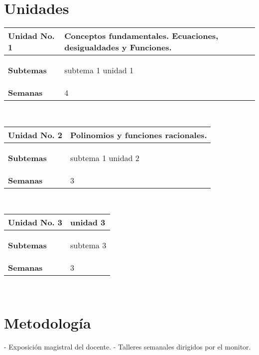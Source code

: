 \documentclass[11pt]{article}
\begin{document}
\section*{Unidades}
\noindent 
\begin{tabular}{R{0.16\textwidth} L{0.7\textwidth}} 
 \\ 
\toprule \textbf{Unidad No. 1} & Conceptos fundamentales. Ecuaciones, desigualdades y  Funciones. 
 \\ 
\midrule\textbf{Subtemas} & 
\begin{description}
 \item subtema 1 unidad 1 
\end{description}
 \\ 
\textbf{Semanas} & 4 
\end{tabular} 
 \\ 
 \begin{tabular}{R{0.16\textwidth} L{0.7\textwidth}} 
 \\ 
\toprule \textbf{Unidad No. 2} & Polinomios y funciones racionales. 
 \\ 
\midrule\textbf{Subtemas} & 
\begin{description}
 \item subtema 1 unidad 2 
\end{description}
 \\ 
\textbf{Semanas} & 3 
\end{tabular} 
 \\ 
 \begin{tabular}{R{0.16\textwidth} L{0.7\textwidth}} 
 \\ 
\toprule \textbf{Unidad No. 3} & unidad 3 
 \\ 
\midrule\textbf{Subtemas} & 
\begin{description}
 \item subtema 3 
\end{description}
 \\ 
\textbf{Semanas} & 3 
\end{tabular} 
 \\ 
 

\section*{Metodología}

- Exposición magistral del docente. - Talleres semanales dirigidos por el monitor.

\end{document}
